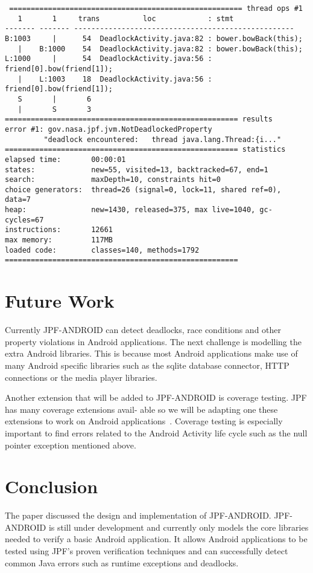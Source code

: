 \documentclass{acm_proc_article-sp}
\begin{document}
\vspace*{-10pt}
\begingroup
 \fontsize{6pt}{7pt}\selectfont
\begin{verbatim}
 ====================================================== thread ops #1
   1       1     trans          loc            : stmt
------- ------- ---------------------------------------------------
B:1003     |      54  DeadlockActivity.java:82 : bower.bowBack(this);
   |    B:1000    54  DeadlockActivity.java:82 : bower.bowBack(this);
L:1000     |      54  DeadlockActivity.java:56 : friend[0].bow(friend[1]);
   |    L:1003    18  DeadlockActivity.java:56 : friend[0].bow(friend[1]);
   S       |       6
   |       S       3
====================================================== results
error #1: gov.nasa.jpf.jvm.NotDeadlockedProperty 
         "deadlock encountered:   thread java.lang.Thread:{i..."
====================================================== statistics
elapsed time:       00:00:01
states:             new=55, visited=13, backtracked=67, end=1
search:             maxDepth=10, constraints hit=0
choice generators:  thread=26 (signal=0, lock=11, shared ref=0), data=7
heap:               new=1430, released=375, max live=1040, gc-cycles=67
instructions:       12661
max memory:         117MB
loaded code:        classes=140, methods=1792
======================================================
\end{verbatim}
\endgroup
\vspace*{-10pt}
\section{Future Work}
Currently JPF-ANDROID can detect deadlocks, race conditions and other property violations in Android applications. The next challenge is
modelling the extra Android libraries. This is because most Android applications make use of many Android specific
libraries such as the sqlite database connector, HTTP connections or the media player libraries.

Another extension that will be added to JPF-ANDROID is coverage testing. JPF has many coverage extensions avail-
\balancecolumns
able so we will be adapting
one these extensions to work on Android applications~\cite{coverage}. Coverage testing is especially important to find errors related to the Android Activity
life cycle such as the null pointer exception mentioned above.

\section{Conclusion}
The paper discussed the design and implementation of JPF-ANDROID. JPF-ANDROID is still under development and currently only models
the core libraries needed to verify a basic Android application. It allows Android applications to be tested using JPF's proven verification
techniques and can successfully detect common Java errors such as runtime exceptions and deadlocks.
\end{document}
